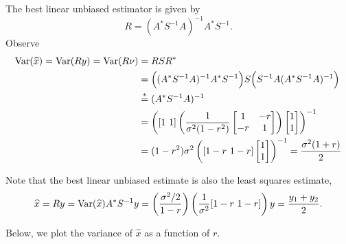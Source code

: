 \documentclass{homework}
\begin{document}

\begin{solution}
  The best linear unbiased estimator is given by
  $$
  R = (A^*S^{-1}A)^{-1} A^*S^{-1}.
  $$
  Observe
  \begin{align*}
    \mathrm{Var}(\widehat x) 
      = \mathrm{Var}( R y ) = \mathrm{Var}( R \nu ) &= R S R^* \\
      &=\Big((A^*S^{-1}A)^{-1} A^*S^{-1}\Big) S  \Big(S^{-1} A (A^*S^{-1}A)^{-1}\Big)\\
      &\stackrel*=(A^*S^{-1}A)^{-1} \\
      &=
	\left(
	[1\,\, 1]
	\left(\frac 1{\sigma^2(1-r^2)} \begin{bmatrix} 1 & -r \\ -r & 1 \end{bmatrix} \right) 
	\begin{bmatrix} 1 \\ 1 \end{bmatrix} \right)^{-1}\\
      &=(1-r^2)\sigma^2 \left( [1-r\,\, 1-r] \begin{bmatrix} 1\\ 1\end{bmatrix} \right)^{-1}
      = \frac{\sigma^2(1+r)}{2}
  \end{align*}

  Note that the best linear unbiased estimate is also the least squares estimate,
  $$
    \widehat x = R y = \mathrm{Var}(\widehat x) A^* S^{-1} y = \left(\frac{\sigma^2/2}{1-r} \right) \left(\frac{1}{\sigma^2} [1-r\,\,1-r]\right) y = \frac{y_1 + y_2}{2}.
  $$
\end{solution}


Below, we plot the variance of $\hat x$ as a function of $r$.  
\end{document}
